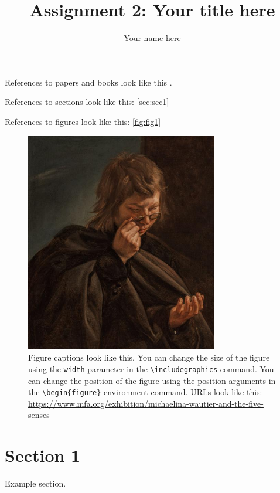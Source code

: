 \documentclass{article}
\title{Assignment 2: Your title here}
\author{Your name here}
\begin{document}
  \maketitle %
  \thispagestyle{empty}

References to papers and books look like this \cite{munzner2014visualization}. 

References to sections look like this: \autoref{sec:sec1}

References to figures look like this: \autoref{fig:fig1}

\begin{figure}[ht] %
    \centering
    \includegraphics[width=0.75\textwidth]{figs/sight.jpg}
    \caption{
        Figure captions look like this. You can change the size of the figure using the \texttt{width} parameter in the \texttt{\textbackslash includegraphics} command. You can change the position of the figure using the position arguments in the \texttt{\textbackslash begin\{figure\}} environment command.
        URLs look like this: \url{https://www.mfa.org/exhibition/michaelina-wautier-and-the-five-senses}
    }
    \label{fig:fig1}
\end{figure}

\section{Section 1}
\label{sec:sec1}
Example section.

\begin{refcontext}[sorting=nyt]
\printbibliography
\end{refcontext}
\end{document}
